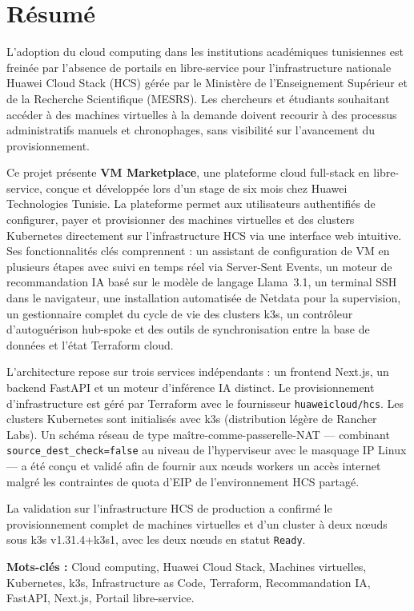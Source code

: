 \chapter*{Résumé}

L'adoption du cloud computing dans les institutions académiques tunisiennes est freinée
par l'absence de portails en libre-service pour l'infrastructure nationale
Huawei Cloud Stack (HCS) gérée par le Ministère de l'Enseignement Supérieur et de la
Recherche Scientifique (MESRS). Les chercheurs et étudiants souhaitant accéder à des
machines virtuelles à la demande doivent recourir à des processus administratifs
manuels et chronophages, sans visibilité sur l'avancement du provisionnement.

Ce projet présente \textbf{VM Marketplace}, une plateforme cloud full-stack en
libre-service, conçue et développée lors d'un stage de six mois chez Huawei
Technologies Tunisie. La plateforme permet aux utilisateurs authentifiés de
configurer, payer et provisionner des machines virtuelles et des clusters Kubernetes
directement sur l'infrastructure HCS via une interface web intuitive. Ses
fonctionnalités clés comprennent : un assistant de configuration de VM en plusieurs
étapes avec suivi en temps réel via Server-Sent Events, un moteur de recommandation
IA basé sur le modèle de langage Llama~3.1, un terminal SSH dans le navigateur,
une installation automatisée de Netdata pour la supervision, un gestionnaire complet
du cycle de vie des clusters k3s, un contrôleur d'autoguérison hub-spoke et des outils
de synchronisation entre la base de données et l'état Terraform cloud.

L'architecture repose sur trois services indépendants : un frontend Next.js, un backend
FastAPI et un moteur d'inférence IA distinct. Le provisionnement d'infrastructure est
géré par Terraform avec le fournisseur \texttt{huaweicloud/hcs}. Les clusters
Kubernetes sont initialisés avec k3s (distribution légère de Rancher Labs). Un schéma
réseau de type \og{}maître-comme-passerelle-NAT\fg{} --- combinant
\texttt{source\_dest\_check=false} au niveau de l'hyperviseur avec le masquage IP Linux
--- a été conçu et validé afin de fournir aux nœuds workers un accès internet malgré
les contraintes de quota d'EIP de l'environnement HCS partagé.

La validation sur l'infrastructure HCS de production a confirmé le provisionnement
complet de machines virtuelles et d'un cluster à deux nœuds sous k3s v1.31.4+k3s1,
avec les deux nœuds en statut \texttt{Ready}.

\bigskip
\noindent\textbf{Mots-clés :} Cloud computing, Huawei Cloud Stack, Machines virtuelles,
Kubernetes, k3s, Infrastructure as Code, Terraform, Recommandation IA, FastAPI, Next.js,
Portail libre-service.

\clearpage
